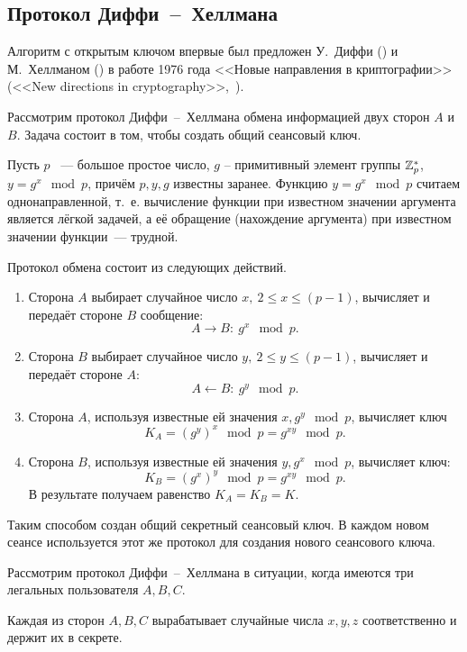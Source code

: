 \subsection{Протокол Диффи~--~Хеллмана}

Алгоритм с открытым ключом впервые был предложен У.~Диффи () и М.~Хеллманом () в работе 1976 года <<Новые направления в криптографии>>(<<New directions in cryptography>>,~\cite{Diffie:Hellman:1976}).

Рассмотрим протокол Диффи~--~Хеллмана обмена информацией двух сторон $A$ и $B$. Задача состоит в том, чтобы создать общий сеансовый ключ.

Пусть $p$ ~--- большое простое число, $g$ -- примитивный элемент группы $\mathbb{Z}_p^*$, ~ $y = g^x \mod p$, причём $p,y,g$ известны заранее. Функцию $y=g^{x} \mod p$ считаем однонаправленной, т.~е. вычисление функции при известном значении аргумента является лёгкой задачей, а её обращение (нахождение аргумента) при известном значении функции~--- трудной.

Протокол обмена состоит из следующих действий.
\begin{enumerate}
    \item Сторона $A$ выбирает случайное число $x, ~ 2 \leq x \leq (p-1)$, вычисляет и передаёт стороне $B$ сообщение:
        \[ A \rightarrow B: ~ g^x \mod p. \]
    \item Сторона $B$ выбирает случайное число $y, ~ 2\leq y \leq (p-1)$, вычисляет и передаёт стороне $A$:
        \[ A \leftarrow B: ~ g^y \mod p. \]
    \item Сторона $A$, используя известные ей значения $x,g^{y} \mod p$, вычисляет ключ
        \[ K_{A} =(g^{y})^{x}\mod p=g^{xy} \mod p. \]
    \item Сторона $B$, используя известные ей значения $y,g^{x} \mod p$, вычисляет ключ:
        \[ K_{B} =(g^{x})^{y}\mod p=g^{xy}\mod p. \]
        В результате получаем равенство $K_A = K_B = K$.
\end{enumerate}

Таким способом создан общий секретный сеансовый ключ. В каждом новом сеансе используется этот же протокол для создания нового сеансового ключа.

Рассмотрим протокол Диффи~--~Хеллмана в ситуации, когда имеются три легальных пользователя $A,B,C$.

Каждая из сторон $A,B,C$ вырабатывает случайные числа $x,y,z$ соответственно и держит их в секрете.

